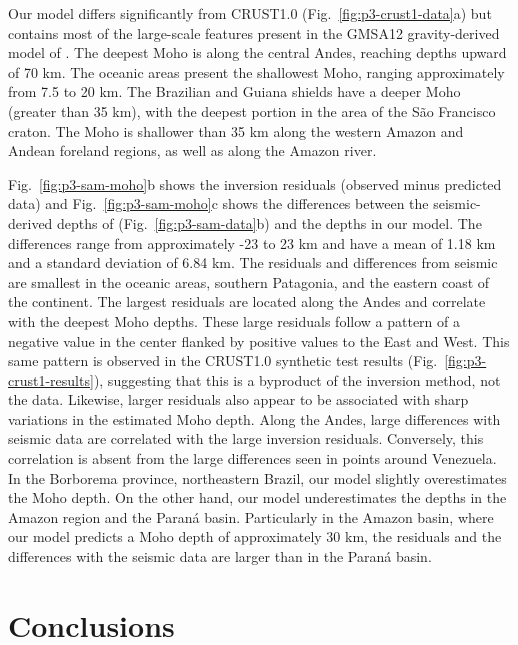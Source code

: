 Our model differs significantly from CRUST1.0 (Fig.~\ref{fig:p3-crust1-data}a)
but contains most of the large-scale features
present in the GMSA12 gravity-derived model of \citet{vandermeijde2013}.
The deepest Moho is along the central Andes, reaching depths upward of 70 km.
The oceanic areas present the shallowest Moho, ranging approximately
from 7.5 to 20 km.
The Brazilian and Guiana shields have a deeper Moho (greater than 35 km),
with the deepest portion in the area of the São Francisco craton.
The Moho is shallower than 35 km along the western Amazon and Andean foreland
regions, as well as along the Amazon river.

Fig.~\ref{fig:p3-sam-moho}b shows the inversion residuals
(observed minus predicted data)
and Fig.~\ref{fig:p3-sam-moho}c shows the differences between
the seismic-derived depths of \citet{assumpcao2013a}
(Fig.~\ref{fig:p3-sam-data}b) and the depths in our model.
The differences range from approximately -23 to 23 km
and have a mean of 1.18 km and a standard deviation of 6.84 km.
The residuals and differences from seismic are smallest in the oceanic areas,
southern Patagonia, and the eastern coast of the continent.
The largest residuals are located along the Andes and correlate with the
deepest Moho depths.
These large residuals follow a pattern of a negative value in the center
flanked by positive values to the East and West.
This same pattern is observed in the CRUST1.0 synthetic test results
(Fig.~\ref{fig:p3-crust1-results}),
suggesting that this is a byproduct of the inversion method, not the data.
Likewise, larger residuals also appear to be associated with sharp variations
in the estimated Moho depth.
Along the Andes, large differences with seismic data are correlated with the
large inversion residuals.
Conversely, this correlation is absent from the large differences seen in
points around Venezuela.
In the Borborema province, northeastern Brazil,
our model slightly overestimates the Moho depth.
On the other hand, our model underestimates the depths
in the Amazon region and the Paraná basin.
Particularly in the Amazon basin,
where our model predicts a Moho depth of approximately 30 km,
the residuals and the differences with the seismic data are larger than in the
Paraná basin.



\section{Conclusions}

